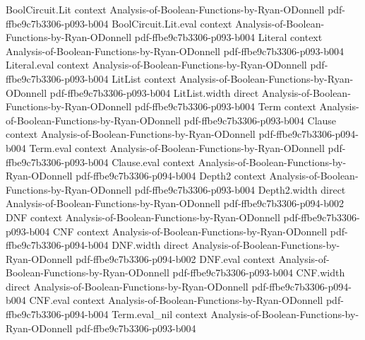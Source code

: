 \begin{lemma}
\label{LowDegreeTest.gowers_product_zero}
\leanok
{}
\proofstep
  {BoolCircuit.Lit}
  {context}
  {Analysis-of-Boolean-Functions-by-Ryan-ODonnell}
  {pdf-ffbe9c7b3306-p093-b004}
\proofstep
  {BoolCircuit.Lit.eval}
  {context}
  {Analysis-of-Boolean-Functions-by-Ryan-ODonnell}
  {pdf-ffbe9c7b3306-p093-b004}
\proofstep
  {Literal}
  {context}
  {Analysis-of-Boolean-Functions-by-Ryan-ODonnell}
  {pdf-ffbe9c7b3306-p093-b004}
\proofstep
  {Literal.eval}
  {context}
  {Analysis-of-Boolean-Functions-by-Ryan-ODonnell}
  {pdf-ffbe9c7b3306-p093-b004}
\proofstep
  {LitList}
  {context}
  {Analysis-of-Boolean-Functions-by-Ryan-ODonnell}
  {pdf-ffbe9c7b3306-p093-b004}
\proofstep
  {LitList.width}
  {direct}
  {Analysis-of-Boolean-Functions-by-Ryan-ODonnell}
  {pdf-ffbe9c7b3306-p093-b004}
\proofstep
  {Term}
  {context}
  {Analysis-of-Boolean-Functions-by-Ryan-ODonnell}
  {pdf-ffbe9c7b3306-p093-b004}
\proofstep
  {Clause}
  {context}
  {Analysis-of-Boolean-Functions-by-Ryan-ODonnell}
  {pdf-ffbe9c7b3306-p094-b004}
\proofstep
  {Term.eval}
  {context}
  {Analysis-of-Boolean-Functions-by-Ryan-ODonnell}
  {pdf-ffbe9c7b3306-p093-b004}
\proofstep
  {Clause.eval}
  {context}
  {Analysis-of-Boolean-Functions-by-Ryan-ODonnell}
  {pdf-ffbe9c7b3306-p094-b004}
\proofstep
  {Depth2}
  {context}
  {Analysis-of-Boolean-Functions-by-Ryan-ODonnell}
  {pdf-ffbe9c7b3306-p093-b004}
\proofstep
  {Depth2.width}
  {direct}
  {Analysis-of-Boolean-Functions-by-Ryan-ODonnell}
  {pdf-ffbe9c7b3306-p094-b002}
\proofstep
  {DNF}
  {context}
  {Analysis-of-Boolean-Functions-by-Ryan-ODonnell}
  {pdf-ffbe9c7b3306-p093-b004}
\proofstep
  {CNF}
  {context}
  {Analysis-of-Boolean-Functions-by-Ryan-ODonnell}
  {pdf-ffbe9c7b3306-p094-b004}
\proofstep
  {DNF.width}
  {direct}
  {Analysis-of-Boolean-Functions-by-Ryan-ODonnell}
  {pdf-ffbe9c7b3306-p094-b002}
\proofstep
  {DNF.eval}
  {context}
  {Analysis-of-Boolean-Functions-by-Ryan-ODonnell}
  {pdf-ffbe9c7b3306-p093-b004}
\proofstep
  {CNF.width}
  {direct}
  {Analysis-of-Boolean-Functions-by-Ryan-ODonnell}
  {pdf-ffbe9c7b3306-p094-b004}
\proofstep
  {CNF.eval}
  {context}
  {Analysis-of-Boolean-Functions-by-Ryan-ODonnell}
  {pdf-ffbe9c7b3306-p094-b004}
\proofstep
  {Term.eval_nil}
  {context}
  {Analysis-of-Boolean-Functions-by-Ryan-ODonnell}
  {pdf-ffbe9c7b3306-p093-b004}

\end{lemma}
